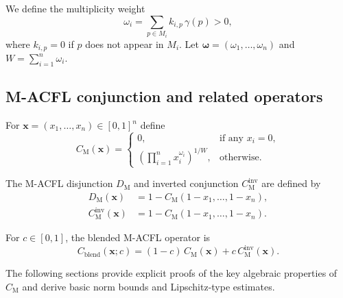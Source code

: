 \documentclass[11pt]{article}
\begin{document}
We define the multiplicity weight
\begin{equation}
\omega_i = \sum_{p \in M_i} k_{i,p}\,\gamma(p) > 0,
\label{eq:omega-app}
\end{equation}
where $k_{i,p}=0$ if $p$ does not appear in $M_i$.
Let $\boldsymbol{\omega} = (\omega_1,\dots,\omega_n)$ and $W = \sum_{i=1}^n \omega_i$.

\subsection{M-ACFL conjunction and related operators}

\begin{definition}
For $\mathbf{x} = (x_1,\dots,x_n) \in [0,1]^n$ define
\begin{equation}
C_{\mathrm{M}}(\mathbf{x}) =
\begin{cases}
0, & \text{if any } x_i = 0, \\[4pt]
\left(\displaystyle\prod_{i=1}^n x_i^{\omega_i}\right)^{1/W}, & \text{otherwise.}
\end{cases}
\label{eq:m-acfl-conj-app}
\end{equation}
\end{definition}

\begin{definition}
The M-ACFL disjunction $D_{\mathrm{M}}$ and inverted conjunction $C_{\mathrm{M}}^{\mathrm{inv}}$ are defined by
\begin{align}
D_{\mathrm{M}}(\mathbf{x}) &= 1 - C_{\mathrm{M}}(1 - x_1,\dots,1 - x_n), \label{eq:m-acfl-disj-app} \\
C_{\mathrm{M}}^{\mathrm{inv}}(\mathbf{x}) &= 1 - C_{\mathrm{M}}(1 - x_1,\dots,1 - x_n).
\label{eq:m-acfl-inv-app}
\end{align}
\end{definition}

\begin{definition}
For $c \in [0,1]$, the blended M-ACFL operator is
\begin{equation}
C_{\mathrm{blend}}(\mathbf{x};c) = (1-c)\,C_{\mathrm{M}}(\mathbf{x}) + c\,C_{\mathrm{M}}^{\mathrm{inv}}(\mathbf{x}).
\label{eq:m-acfl-blend-app}
\end{equation}
\end{definition}

The following sections provide explicit proofs of the key algebraic properties of $C_{\mathrm{M}}$ and derive basic norm bounds and Lipschitz-type estimates.
\end{document}
